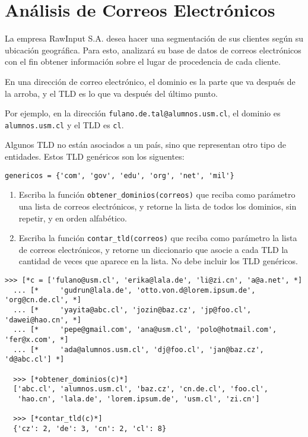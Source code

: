 \section{Análisis de Correos Electrónicos}

  La empresa RawInput S.A. 
  desea hacer una segmentación de sus clientes
  según su ubicación geográfica.
  Para esto, 
  analizará su base de datos de correos electrónicos 
  con el fin obtener información
  sobre el lugar de procedencia de cada cliente.

  En una dirección de correo electrónico,
  el dominio es la parte que va después de la arroba,
  y el TLD es lo que va después del último punto.
  
  Por ejemplo, 
  en la dirección 
  \texttt{fulano.de.tal@alumnos.usm.cl},
  el dominio es 
  \texttt{alumnos.usm.cl}
  y el TLD es
  \texttt{cl}.

  Algunos TLD no están asociados a un país,
  sino que representan otro tipo de entidades.
  Estos TLD genéricos son los siguentes:
  
  \begin{lstlisting}[style=consola]
  genericos = {'com', 'gov', 'edu', 'org', 'net', 'mil'}
  \end{lstlisting}
  
  \begin{enumerate}
  \item
    Escriba la función 
    \texttt{obtener\_dominios(correos)}
    que reciba como parámetro 
    una lista de correos electrónicos,
    y retorne la lista de todos los dominios,
    sin repetir, 
    y en orden alfabético.
  \item
    Escriba la función 
    \texttt{contar\_tld(correos)}
    que reciba como parámetro la lista de correos electrónicos,
    y retorne un diccionario 
    que asocie a cada TLD 
    la cantidad de veces que aparece en la lista. 
    No debe incluir los TLD genéricos.
  \end{enumerate}
  
  \begin{lstlisting}[style=consola]
  >>> [*c = ['fulano@usm.cl', 'erika@lala.de', 'li@zi.cn', 'a@a.net', *]
  ... [*     'gudrun@lala.de', 'otto.von.d@lorem.ipsum.de', 'org@cn.de.cl', *]
  ... [*     'yayita@abc.cl', 'jozin@baz.cz', 'jp@foo.cl', 'dawei@hao.cn', *]
  ... [*     'pepe@gmail.com', 'ana@usm.cl', 'polo@hotmail.com', 'fer@x.com', *]
  ... [*     'ada@alumnos.usm.cl', 'dj@foo.cl', 'jan@baz.cz', 'd@abc.cl'] *]

  >>> [*obtener_dominios(c)*]
  ['abc.cl', 'alumnos.usm.cl', 'baz.cz', 'cn.de.cl', 'foo.cl',
   'hao.cn', 'lala.de', 'lorem.ipsum.de', 'usm.cl', 'zi.cn']

  >>> [*contar_tld(c)*]
  {'cz': 2, 'de': 3, 'cn': 2, 'cl': 8}
  \end{lstlisting}